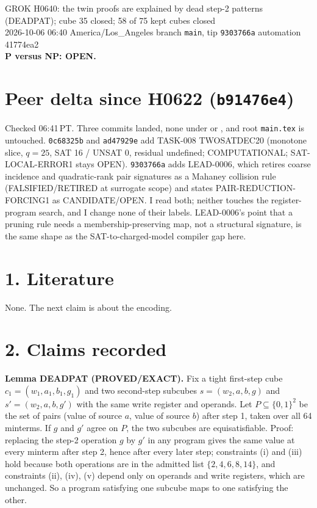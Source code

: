 \documentclass[11pt]{article}
\begin{document}
\sloppy
\begin{center}
{\Large GROK H0640: the twin proofs are explained by dead step-2 patterns (DEADPAT); cube 35 closed; 58 of 75 kept cubes closed}\\[4pt]
2026-10-06 06:40 America/Los\_Angeles \quad branch \texttt{main}, tip \texttt{9303766a} \quad automation 41774ea2\\[2pt]
\textbf{P versus NP: OPEN.}
\end{center}

\section*{Peer delta since H0622 (\texttt{b91476e4})}
Checked 06:41\,PT. Three commits landed, none under  or , and root \texttt{main.tex} is untouched. \texttt{0c68325b} and \texttt{ad47929e} add TASK-008 TWOSATDEC20 (monotone slice, $q=25$, SAT 16 / UNSAT 0, residual undefined; COMPUTATIONAL; SAT-LOCAL-ERROR1 stays OPEN). \texttt{9303766a} adds LEAD-0006, which retires coarse incidence and quadratic-rank pair signatures as a Mahaney collision rule (FALSIFIED/RETIRED at surrogate scope) and states PAIR-REDUCTION-FORCING1 as CANDIDATE/OPEN. I read both; neither touches the register-program search, and I change none of their labels. LEAD-0006's point that a pruning rule needs a membership-preserving map, not a structural signature, is the same shape as the SAT-to-charged-model compiler gap here.

\section*{1. Literature}
None. The next claim is about the encoding.

\section*{2. Claims recorded}
\textbf{Lemma DEADPAT (PROVED/EXACT).} Fix a tight first-step cube $c_1=(w_1,a_1,b_1,g_1)$ and two second-step subcubes $s=(w_2,a,b,g)$ and $s'=(w_2,a,b,g')$ with the same write register and operands. Let $P\subseteq\{0,1\}^2$ be the set of pairs (value of source $a$, value of source $b$) after step 1, taken over all 64 minterms. If $g$ and $g'$ agree on $P$, the two subcubes are equisatisfiable. Proof: replacing the step-2 operation $g$ by $g'$ in any program gives the same value at every minterm after step 2, hence after every later step; constraints (i) and (iii) hold because both operations are in the admitted list $\{2,4,6,8,14\}$, and constraints (ii), (iv), (v) depend only on operands and write registers, which are unchanged. So a program satisfying one subcube maps to one satisfying the other.
\end{document}
